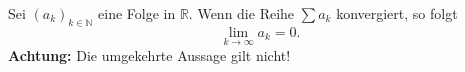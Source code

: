 Sei $(a_k)_{k \in \mathbb{N}}$ eine Folge in $\mathbb{R}$. Wenn die Reihe $\sum a_k$ konvergiert, so folgt
$$\lim_{k \to \infty} a_k = 0.$$
\textbf{Achtung:} Die umgekehrte Aussage gilt nicht!